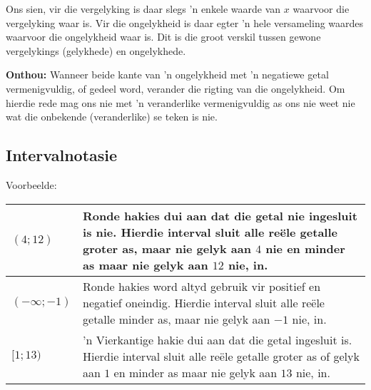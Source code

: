 Ons sien, vir die vergelyking is daar slegs ’n enkele waarde van  $x$ waarvoor die vergelyking waar is. Vir
die ongelykheid is daar egter ’n hele versameling waardes waarvoor die ongelykheid waar is. Dit is die groot
verskil tussen gewone vergelykings (gelykhede) en ongelykhede.\par 

\textbf{Onthou: } Wanneer beide kante van ’n ongelykheid met ’n negatiewe getal vermenigvuldig, of gedeel word, verander die rigting van
die ongelykheid. Om hierdie rede mag ons nie met ’n veranderlike vermenigvuldig as
ons nie weet nie wat die onbekende (veranderlike) se teken is nie.\par
{}

\subsection*{Intervalnotasie}
Voorbeelde:
\\
\begin{table}[H]
\begin{tabular}{|p{5cm}|p{8cm}|}
\hline
  $(4;12)$ &  Ronde hakies dui aan dat die getal nie ingesluit is nie. Hierdie interval sluit alle reële getalle groter as, maar nie gelyk aan $4$ nie en minder as maar nie gelyk aan $12$ nie, in.
\\ \hline
 $(- \infty; -1)$ & Ronde hakies word altyd gebruik vir positief en negatief oneindig. Hierdie interval sluit alle reële getalle minder as, maar nie gelyk aan $-1$ nie, in.
\\ \hline
 $[1; 13)$ & 'n Vierkantige hakie dui aan dat die getal ingesluit is. Hierdie interval sluit alle reële getalle groter as of gelyk aan $1$ en minder as maar nie gelyk aan $13$ nie, in.
\\ \hline
\end{tabular}
\end{table}

